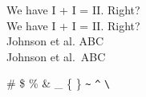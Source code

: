 \documentclass[11pt]{article}
\begin{document}











We have I + I = II. Right? \\

We have I + I = II\@.  Right? \\
Johnson et al. ABC \\
Johnson et al.\ ABC

\# \$ \% \& \_ \{ \} \verb|~| \verb|^| \verb|\| 

{\myfont {}   %
   } \space \space
{\myfont {}    %
   }

{\myfont {}}{\myfont {}}{\myfont {}}%
{\myfont {}}{\myfont {}}{\myfont {}}%
{\myfont {}}{\myfont {}}%
\end{document}
